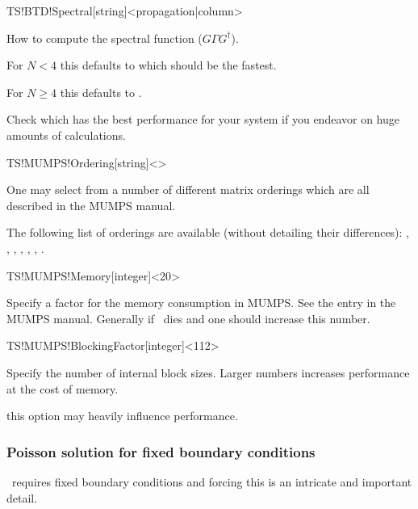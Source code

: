 \begin{fdfentry}{TS!BTD!Spectral}[string]<propagation|column>

  How to compute the spectral function ($G\Gamma G^\dagger$). 

  For $N<4$ this defaults to  which should be the
  fastest.

  For $N\ge4$ this defaults to .

  Check which has the best performance for your system if you endeavor
  on huge amounts of calculations.

\end{fdfentry}


\begin{fdfentry}{TS!MUMPS!Ordering}[string]<>

  One may select from a number of different matrix orderings which are
  all described in the MUMPS manual. 

  The following list of orderings are available (without detailing
  their differences): %
  , , , , ,
  , .
  
\end{fdfentry}

\begin{fdfentry}{TS!MUMPS!Memory}[integer]<20>

  Specify a factor for the memory consumption in MUMPS. See the
   entry in the MUMPS manual. Generally if \tsiesta\
  dies and  one should increase this number.
  
\end{fdfentry}

\begin{fdfentry}{TS!MUMPS!BlockingFactor}[integer]<112>

  Specify the number of internal block sizes. Larger numbers increases
  performance at the cost of memory.
  
  \note this option may heavily influence performance.

\end{fdfentry}

\subsubsection{Poisson solution for fixed boundary conditions}

\tsiesta\ requires fixed boundary conditions and forcing this is an
intricate and important detail. 

